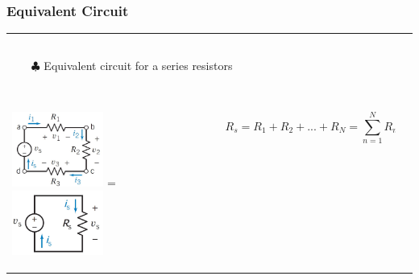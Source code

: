 \documentclass[aspectratio=169]{beamer}
\begin{document}
\begin{frame}[fragile]
	\frametitle{Equivalent Circuit}
		\begin{tabular}{ll}
			\begin{columns}[c]
				\column{1\textwidth}
					\begin{itemize}
						\item[$\clubsuit$] Equivalent circuit for a series resistors
					\end{itemize}
			\end{columns}
		 \\
			\begin{columns}
				\begin{column}{0.5\textwidth}  %
     						\includegraphics[width=3cm]{figura7.JPG}
=
						\includegraphics[width=3cm]{figura9.JPG}
				\end{column}
				\begin{column}{0.5\textwidth}  %
					\begin{equation}
    						 R_{s}= R_{1} +  R_{2} + ... + R_{N}	={\sum_{n=1}^{N} R_{n}}
					\end{equation}
					

\end{column}
\end{columns}
\end{tabular}
\end{frame}
\end{document}
